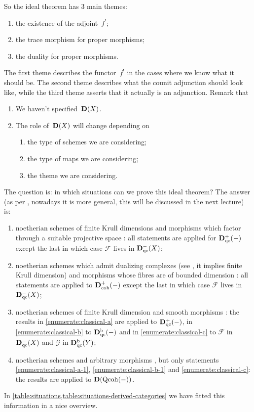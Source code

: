 \documentclass[10pt,a4paper]{article}
\begin{document}
So the ideal theorem has 3 main themes:
\begin{enumerate}
  \item the existence of the adjoint~$f^!$;
  \item the trace morphism for proper morphisms;
  \item the duality for proper morphisms.
\end{enumerate}
The first theme describes the functor~$f^!$ in the cases where we know what it should be. The second theme describes what the counit adjunction should look like, while the third theme asserts that it actually is an adjunction. Remark that
\begin{enumerate}
  \item We haven't specified~$\mathbf{D}(X)$.
  \item The role of~$\mathbf{D}(X)$ will change depending on
    \begin{enumerate}
      \item the type of schemes we are considering;
      \item the type of maps we are considering;
      \item the theme we are considering.
    \end{enumerate}
\end{enumerate}

The question is: in which situations can we prove this ideal theorem? The answer (as per \cite{hartshorne-residues-and-duality}, nowadays it is more general, this will be discussed in the next lecture) is:
\begin{enumerate}
  \item noetherian schemes of finite Krull dimensions and morphisms which factor through a suitable projective space \cite[\S III.8, \S III.10, \S III.11]{hartshorne-residues-and-duality}: all statements are applied for $\mathbf{D}_{\mathrm{qc}}^+(-)$ except the last in which case $\mathcal{F}$ lives in $\mathbf{D}_{\mathrm{qc}}^-(X)$;
  \item noetherian schemes which admit dualizing complexes (see \cite[\S V.10]{hartshorne-residues-and-duality}, it implies finite Krull dimension) and morphisms whose fibres are of bounded dimension \cite[\S VII.3]{hartshorne-residues-and-duality}: all statements are applied to $\mathbf{D}_{\mathrm{coh}}^+(-)$ except the last in which case $\mathcal{F}$ lives in $\mathbf{D}_{\mathrm{qc}}^-(X)$;
  \item noetherian schemes of finite Krull dimension and smooth morphisms \cite[\S VII.4]{hartshorne-residues-and-duality}: the results in \ref{enumerate:classical-a} are applied to $\mathbf{D}_{\mathrm{qc}}^+(-)$, in \ref{enumerate:classical-b} to $\mathbf{D}_{\mathrm{qc}}^{\mathrm{b}}(-)$ and in \ref{enumerate:classical-c} to $\mathcal{F}$ in $\mathbf{D}_{\mathrm{qc}}^-(X)$ and $\mathcal{G}$ in $\mathbf{D}_{\mathrm{qc}}^{\mathrm{b}}(Y)$;
  \item noetherian schemes and arbitrary morphisms \cite[appendix]{hartshorne-residues-and-duality}, but only statements \ref{enumerate:classical-a-1}, \ref{enumerate:classical-b-1} and \ref{enumerate:classical-c}: the results are applied to $\mathbf{D}(\mathrm{Qcoh}(-))$.
\end{enumerate}
In \cref{table:situations,table:situations-derived-categories} we have fitted this information in a nice overview.
\end{document}
